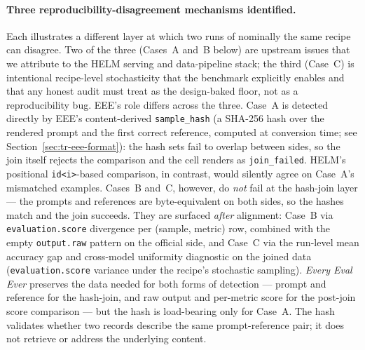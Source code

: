 \documentclass[11pt]{article}
\newcommand{\eee}{\textit{Every Eval Ever}\xspace}
\begin{document}
\paragraph{Three reproducibility-disagreement mechanisms identified.}
Each illustrates a different layer at which two runs of nominally
  the same recipe can disagree.
Two of the three (Cases~A and~B below) are upstream issues that we
  attribute to the HELM serving and data-pipeline stack;
  the third (Case~C) is intentional recipe-level stochasticity that
  the benchmark explicitly enables and that any honest audit must
  treat as the design-baked floor, not as a reproducibility bug.
EEE's role differs across the three.
Case~A is detected directly by EEE's content-derived
  \texttt{sample\_hash}
  (a SHA-256 hash over the rendered prompt and the first correct
  reference, computed at conversion time; see
  Section~\ref{sec:tr-eee-format}): the hash sets fail to overlap
  between sides, so the join itself rejects the comparison and the
  cell renders as \texttt{join\_failed}.
HELM's positional \texttt{id<i>}-based comparison, in contrast, would
  silently agree on Case~A's mismatched examples.
Cases~B and~C, however, do \emph{not} fail at the hash-join layer ---
  the prompts and references are byte-equivalent on both sides, so
  the hashes match and the join succeeds.
They are surfaced \emph{after} alignment: Case~B via
  \texttt{evaluation.score} divergence per (sample, metric) row,
  combined with the empty \texttt{output.raw} pattern on the official
  side, and Case~C via the run-level mean accuracy gap and
  cross-model uniformity diagnostic on the joined data
  (\texttt{evaluation.score} variance under the recipe's stochastic
  sampling).
\eee{} preserves the data needed for both forms of detection ---
  prompt and reference for the hash-join, and raw output and per-metric
  score for the post-join score comparison --- but the hash is
  load-bearing only for Case~A.
The hash validates whether two records describe the same
  prompt-reference pair; it does not retrieve or address the
  underlying content.
\end{document}
